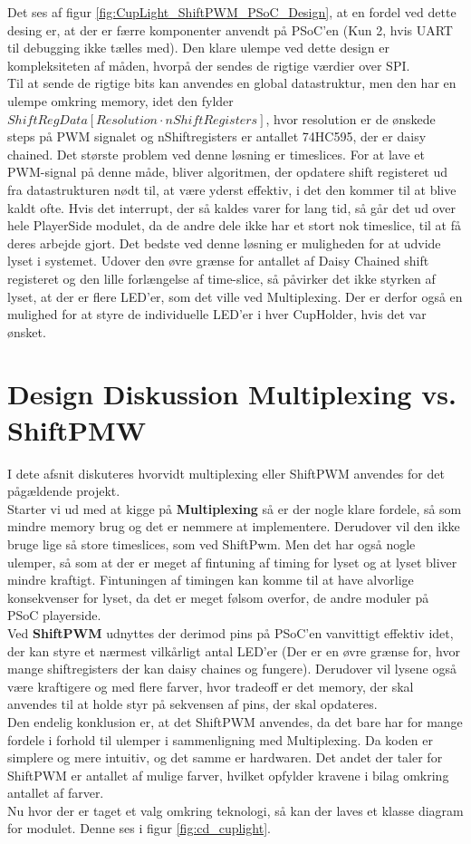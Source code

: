 \documentclass[Softwaredesign/Softwaredesign_main.tex]{subfiles}
\begin{document}
Det ses af figur \ref{fig:CupLight_ShiftPWM_PSoC_Design}, at en fordel ved dette desing er, at der er færre komponenter anvendt på PSoC'en (Kun 2, hvis UART til debugging ikke tælles med). Den klare ulempe ved dette design er kompleksiteten af måden, hvorpå der sendes de rigtige værdier over SPI.\\
Til at sende de rigtige bits kan anvendes en global datastruktur, men den har en ulempe omkring memory, idet den fylder $ShiftRegData[Resolution \cdot nShiftRegisters]$, hvor resolution er de ønskede steps på PWM signalet og nShiftregisters er antallet 74HC595, der er daisy chained. Det største problem ved denne løsning er timeslices. For at lave et PWM-signal på denne måde, bliver algoritmen, der opdatere shift registeret ud fra datastrukturen nødt til, at være yderst effektiv, i det den kommer til at blive kaldt ofte. Hvis det interrupt, der så kaldes varer for lang tid, så går det ud over hele PlayerSide modulet, da de andre dele ikke har et stort nok timeslice, til at få deres arbejde gjort. Det bedste ved denne løsning er muligheden for at udvide lyset i systemet. Udover den øvre grænse for antallet af Daisy Chained shift registeret og den lille forlængelse af time-slice, så påvirker det ikke styrken af lyset, at der er flere LED'er, som det ville ved Multiplexing. Der er derfor også en mulighed for at styre de individuelle LED'er i hver CupHolder, hvis det var ønsket.

\section{Design Diskussion Multiplexing vs. ShiftPMW}
I dete afsnit diskuteres hvorvidt multiplexing eller ShiftPWM anvendes for det pågældende projekt.\\
Starter vi ud med at kigge på \textbf{Multiplexing} så er der nogle klare fordele, så som mindre memory brug og det er nemmere at implementere. Derudover vil den ikke bruge lige så store timeslices, som ved ShiftPwm. Men det har også nogle ulemper, så som at der er meget af fintuning af timing for lyset og at lyset bliver mindre kraftigt. Fintuningen af timingen kan komme til at have alvorlige konsekvenser for lyset, da det er meget følsom overfor, de andre moduler på PSoC playerside.
\\Ved \textbf{ShiftPWM} udnyttes der derimod pins på PSoC'en vanvittigt effektiv idet, der kan styre et nærmest vilkårligt antal LED'er (Der er en øvre grænse for, hvor mange shiftregisters der kan daisy chaines og fungere). Derudover vil lysene også være kraftigere og med flere farver, hvor tradeoff er det memory, der skal anvendes til at holde styr på sekvensen af pins, der skal opdateres.
\\Den endelig konklusion er, at det ShiftPWM anvendes, da det bare har for mange fordele i forhold til ulemper i sammenligning med Multiplexing. Da koden er simplere og mere intuitiv, og det samme er hardwaren. Det andet der taler for ShiftPWM er antallet af mulige farver, hvilket opfylder kravene i bilag  omkring antallet af farver.\\
Nu hvor der er taget et valg omkring teknologi, så kan der laves et klasse diagram for modulet. Denne ses i figur \ref{fig:cd_cuplight}.
\end{document}

